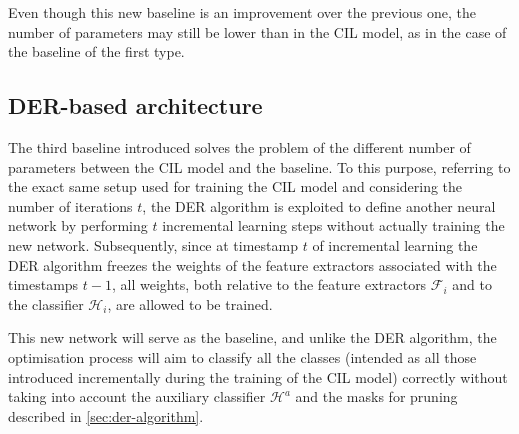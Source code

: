 Even though this new baseline is an improvement over the previous one, the number of parameters may still be lower than in the CIL model, as in the case of the baseline of the first type.

\subsection{DER-based architecture}
The third baseline introduced solves the problem of the different number of parameters between the CIL model and the baseline.
To this purpose, referring to the exact same setup used for training the CIL model and considering the number of iterations $t$, the DER algorithm is exploited to define another neural network by performing $t$ incremental learning steps without actually training the new network.
Subsequently, since at timestamp $t$ of incremental learning the DER algorithm freezes the weights of the feature extractors associated with the timestamps $t-1$, all weights, both relative to the feature extractors $\mathcal{F}_i$ and to the classifier $\mathcal{H}_{i}$, are allowed to be trained.

This new network will serve as the baseline, and unlike the DER algorithm, the optimisation process will aim to classify all the classes (intended as all those introduced incrementally during the training of the CIL model) correctly without taking into account the auxiliary classifier $\mathcal{H}^a$ and the masks for pruning described in \autoref{sec:der-algorithm}.